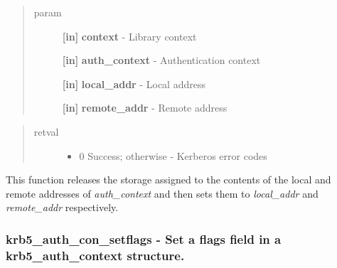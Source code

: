 \documentclass[letterpaper,10pt,english]{sphinxmanual}
\begin{document}
\begin{quote}\begin{description}
\item[{param}] \leavevmode
\textbf{{[}in{]}} \textbf{context} - Library context

\textbf{{[}in{]}} \textbf{auth\_context} - Authentication context

\textbf{{[}in{]}} \textbf{local\_addr} - Local address

\textbf{{[}in{]}} \textbf{remote\_addr} - Remote address

\end{description}\end{quote}
\begin{quote}\begin{description}
\item[{retval}] \leavevmode\begin{itemize}
\item {} 
0   Success; otherwise - Kerberos error codes

\end{itemize}

\end{description}\end{quote}

This function releases the storage assigned to the contents of the local and remote addresses of \emph{auth\_context} and then sets them to \emph{local\_addr} and \emph{remote\_addr} respectively.




{\hyperref[appdev/refs/api/krb5_auth_con_genaddrs:krb5_auth_con_genaddrs]{}}




\subsubsection{krb5\_auth\_con\_setflags -  Set a flags field in a krb5\_auth\_context structure.}
\label{appdev/refs/api/krb5_auth_con_setflags:krb5-auth-con-setflags-set-a-flags-field-in-a-krb5-auth-context-structure}\label{appdev/refs/api/krb5_auth_con_setflags::doc}

\begin{fulllineitems}
\label{appdev/refs/api/krb5_auth_con_setflags:krb5_auth_con_setflags}
\end{fulllineitems}
\end{document}
